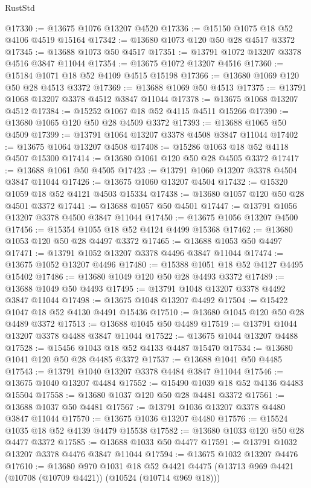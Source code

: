 \begin{lexlean}{RustStd}
\begin{coremodule}
@17330 := @13675 @1076 @13207 @4520
@17336 := @15150 @1075 @18 @52 @4106 @4519 @15164
@17342 := @13680 @1073 @120 @50 @28 @4517 @3372
@17345 := @13688 @1073 @50 @4517
@17351 := @13791 @1072 @13207 @3378 @4516 @3847 @11044
@17354 := @13675 @1072 @13207 @4516
@17360 := @15184 @1071 @18 @52 @4109 @4515 @15198
@17366 := @13680 @1069 @120 @50 @28 @4513 @3372
@17369 := @13688 @1069 @50 @4513
@17375 := @13791 @1068 @13207 @3378 @4512 @3847 @11044
@17378 := @13675 @1068 @13207 @4512
@17384 := @15252 @1067 @18 @52 @4115 @4511 @15266
@17390 := @13680 @1065 @120 @50 @28 @4509 @3372
@17393 := @13688 @1065 @50 @4509
@17399 := @13791 @1064 @13207 @3378 @4508 @3847 @11044
@17402 := @13675 @1064 @13207 @4508
@17408 := @15286 @1063 @18 @52 @4118 @4507 @15300
@17414 := @13680 @1061 @120 @50 @28 @4505 @3372
@17417 := @13688 @1061 @50 @4505
@17423 := @13791 @1060 @13207 @3378 @4504 @3847 @11044
@17426 := @13675 @1060 @13207 @4504
@17432 := @15320 @1059 @18 @52 @4121 @4503 @15334
@17438 := @13680 @1057 @120 @50 @28 @4501 @3372
@17441 := @13688 @1057 @50 @4501
@17447 := @13791 @1056 @13207 @3378 @4500 @3847 @11044
@17450 := @13675 @1056 @13207 @4500
@17456 := @15354 @1055 @18 @52 @4124 @4499 @15368
@17462 := @13680 @1053 @120 @50 @28 @4497 @3372
@17465 := @13688 @1053 @50 @4497
@17471 := @13791 @1052 @13207 @3378 @4496 @3847 @11044
@17474 := @13675 @1052 @13207 @4496
@17480 := @15388 @1051 @18 @52 @4127 @4495 @15402
@17486 := @13680 @1049 @120 @50 @28 @4493 @3372
@17489 := @13688 @1049 @50 @4493
@17495 := @13791 @1048 @13207 @3378 @4492 @3847 @11044
@17498 := @13675 @1048 @13207 @4492
@17504 := @15422 @1047 @18 @52 @4130 @4491 @15436
@17510 := @13680 @1045 @120 @50 @28 @4489 @3372
@17513 := @13688 @1045 @50 @4489
@17519 := @13791 @1044 @13207 @3378 @4488 @3847 @11044
@17522 := @13675 @1044 @13207 @4488
@17528 := @15456 @1043 @18 @52 @4133 @4487 @15470
@17534 := @13680 @1041 @120 @50 @28 @4485 @3372
@17537 := @13688 @1041 @50 @4485
@17543 := @13791 @1040 @13207 @3378 @4484 @3847 @11044
@17546 := @13675 @1040 @13207 @4484
@17552 := @15490 @1039 @18 @52 @4136 @4483 @15504
@17558 := @13680 @1037 @120 @50 @28 @4481 @3372
@17561 := @13688 @1037 @50 @4481
@17567 := @13791 @1036 @13207 @3378 @4480 @3847 @11044
@17570 := @13675 @1036 @13207 @4480
@17576 := @15524 @1035 @18 @52 @4139 @4479 @15538
@17582 := @13680 @1033 @120 @50 @28 @4477 @3372
@17585 := @13688 @1033 @50 @4477
@17591 := @13791 @1032 @13207 @3378 @4476 @3847 @11044
@17594 := @13675 @1032 @13207 @4476
@17610 := @13680
    @970
    @1031
    @18
    @52
    @4421
    @4475
    (@13713 @969 @4421 (@10708 (@10709 @4421)) (@10524 (@10714 @969 @18)))

\end{coremodule}
\end{lexlean}
